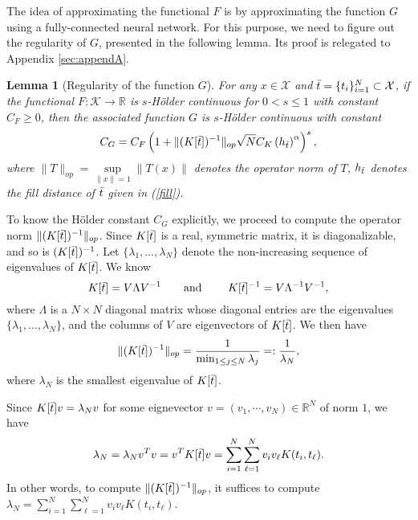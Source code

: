 \documentclass{article}
\def\RR{\mathbb R}
\numberwithin{equation}{section}
\newtheorem{lemma}[theorem]{Lemma}
\begin{document}
The idea of approximating the functional $F$ is by approximating the function $G$ using a fully-connected neural network. For this purpose, we need to figure out the regularity of $G$, presented in the following lemma. 
Its proof is relegated to Appendix \ref{sec:appendA}. 
\begin{lemma}[Regularity of the function $G$]
\label{lemma:reg_G}
For any $x\in \mathcal{X}$ and $\Bar{t}=\{t_i\}_{i=1}^N \subset \mathcal{X}$, if the functional $F:\mathcal{K} \rightarrow \RR$ is $s$-H\"{o}lder continuous for $0<s \leq 1$ with constant $C_F \geq 0$, then the associated function $G$ is $s$-H\"{o}lder continuous with constant $$C_G = C_F\left(1+ \|(K[\Bar{t}])^{-1 }\|_{op}\sqrt{N} C_K \left(h_{\Bar{t}}\right)^\alpha\right)^s,$$ 
where $\|T\|_{op} =\underset{\|x\|=1}{\sup} \|T(x)\|$ denotes the operator norm of $T$, $h_{\Bar{t}}$ denotes the fill distance of  $\Bar{t}$  given in (\ref{fill}).
\end{lemma}

To know the H\"{o}lder constant $C_G$ explicitly, we proceed to compute the operator norm $\|(K[\Bar{t}])^{-1 }\|_{op}$. Since $K[\Bar{t}]$ is a real, symmetric matrix, it is diagonalizable, and so is $(K[\Bar{t}])^{-1 }$. Let $\{\lambda_1, \ldots, \lambda_N\}$ denote the non-increasing sequence of eigenvalues of $K[\Bar{t}]$. We know
\begin{equation*}
    K[\Bar{t}]=V \Lambda V^{-1} \qquad \text{and } \qquad K[\Bar{t}]^{-1}=V \Lambda^{-1} V^{-1}, 
\end{equation*}
where $\Lambda$ is a $N\times N$ diagonal matrix whose diagonal entries are the eigenvalues $\{\lambda_1, \ldots, \lambda_N\}$, and the columns of $V$ are eigenvectors of $K[\Bar{t}]$. We then have  \begin{equation}\label{operatornorm}
    \|(K[\Bar{t}])^{-1}\|_{op} = \frac{1}{\min_{1 \leq j \leq N} \lambda_j} =: \frac{1}{\lambda_{N}},
\end{equation}
where $\lambda_{N}$ is the smallest eigenvalue of $K[\Bar{t}]$.

Since $K[\Bar{t}] v = \lambda_{N} v$ for some eignevector $v=(v_1, \cdots, v_N)\in \RR^N$ of norm $1$, we have
\begin{eqnarray} \label{lambda_N}
    \lambda_{N} = \lambda_{N} v^T v = v^T K[\Bar{t}] v 
    = \sum_{i=1}^N  \sum_{\ell=1}^N v_i v_\ell K(t_i, t_\ell). 
\end{eqnarray}
In other words, to compute $\|(K[\Bar{t}])^{-1}\|_{op}$, it suffices to compute  $\lambda_{N} = \sum_{i=1}^N  \sum_{\ell=1}^N v_i v_\ell K(t_i, t_\ell)$. 
\end{document}
